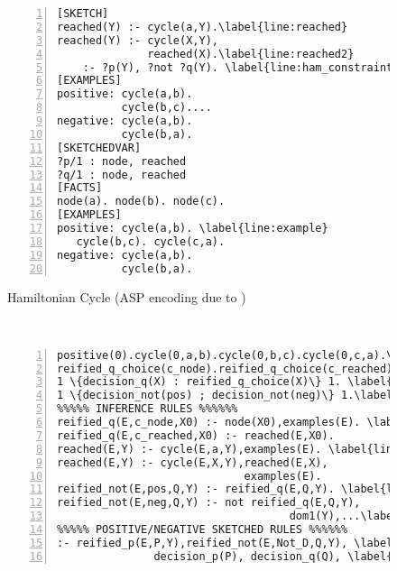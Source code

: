 \newcommand{\rulesep}{\unskip\ \vrule\ }
\newcommand{\hrulesep}{\unskip\ \hrule\ }

\begin{figure*}[htb]
\begin{subfigure}[t]{0.315\textwidth}
  \renewcommand{\figurename}{Listing}
  \vspace{3pt}
  \begin{Verbatim}[fontsize=\scriptsize,numbers=left,xleftmargin=0mm,commandchars=\\\{\}]
[SKETCH]
reached(Y) :- cycle(a,Y).\label{line:reached}
reached(Y) :- cycle(X,Y), 
              reached(X).\label{line:reached2}
    :- ?p(Y), ?not ?q(Y). \label{line:ham_constraint}
[EXAMPLES]
positive: cycle(a,b). 
          cycle(b,c)....
negative: cycle(a,b).
          cycle(b,a).
[SKETCHEDVAR]
?p/1 : node, reached
?q/1 : node, reached
[FACTS]
node(a). node(b). node(c).
[EXAMPLES]
positive: cycle(a,b). \label{line:example}
   cycle(b,c). cycle(c,a).
negative: cycle(a,b). 
          cycle(b,a).
\end{Verbatim}
\caption{Hamiltonian Cycle (ASP encoding due to \protect\cite{ASPbook})} \label{lst:ham}
\end{subfigure}
\rulesep
\begin{subfigure}[t]{0.66\textwidth}
  \vspace{3pt}
  \renewcommand{\figurename}{Sketch}
  \begin{Verbatim}[fontsize=\scriptsize,numbers=left,xleftmargin=5.7mm,commandchars=\\\{\}]
%%%%% EXAMPLES AND DECISIONS %%%%%%
positive(0).cycle(0,a,b).cycle(0,b,c).cycle(0,c,a).\label{line:example_rewritten}
reified_q_choice(c_node).reified_q_choice(c_reached).
1 \{decision_q(X) : reified_q_choice(X)\} 1. \label{line:decision1}
1 \{decision_not(pos) ; decision_not(neg)\} 1.\label{line:decision2}
%%%%% INFERENCE RULES %%%%%%
reified_q(E,c_node,X0) :- node(X0),examples(E). \label{line:reified_q}
reified_q(E,c_reached,X0) :- reached(E,X0).
reached(E,Y) :- cycle(E,a,Y),examples(E). \label{line:reach_rewritten}
reached(E,Y) :- cycle(E,X,Y),reached(E,X),
                             examples(E).
reified_not(E,pos,Q,Y) :- reified_q(E,Q,Y). \label{line:reified_not1}
reified_not(E,neg,Q,Y) :- not reified_q(E,Q,Y),
                                    dom1(Y),...\label{line:reified_not2}
%%%%% POSITIVE/NEGATIVE SKETCHED RULES %%%%%%
:- reified_p(E,P,Y),reified_not(E,Not_D,Q,Y), \label{line:positive_rewritten1}
               decision_p(P), decision_q(Q), \label{line:positive_rewritten2}

\end{Verbatim}
\end{subfigure}
\end{figure*}
